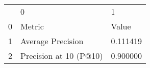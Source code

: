 \begin{tabular}{lll}
 & 0 & 1 \\
0 & Metric & Value \\
1 & Average Precision & 0.111419 \\
2 & Precision at 10 (P@10) & 0.900000 \\
\end{tabular}
